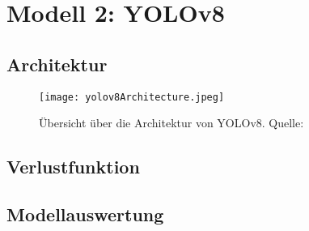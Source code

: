 \chapter{Modell 2: YOLOv8}\label{chap:yolov8}
\section{Architektur}
\begin{figure}[h]
	\centering
	\texttt{[image: yolov8Architecture.jpeg]}
	\caption[Übersicht über die Architektur von YOLOv8]{Übersicht über die Architektur von YOLOv8. Quelle: \cite{yoloArchitecture}}
	\label{fig:yolov8Architecture}
\end{figure}


\section{Verlustfunktion}



\section{Modellauswertung}